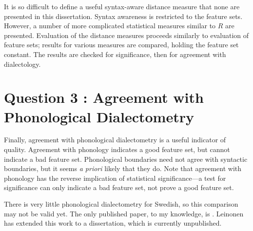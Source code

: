 It is so difficult to define a useful syntax-aware distance measure
that none are presented in this dissertation. Syntax awareness is
restricted to the feature sets. However, a number of more complicated
statistical measures similar to $R$ are presented. Evaluation of the
distance measures proceeds similarly to evaluation of feature sets;
results for various measures are compared, holding the feature set
constant. The results are checked for significance, then for agreement
with dialectology.


\section{Question 3 : Agreement with Phonological Dialectometry}

Finally, agreement with phonological dialectometry is a useful
indicator of quality. Agreement with phonology indicates a good
feature set, but cannot indicate a bad feature set. Phonological
boundaries need not agree with syntactic boundaries, but it seems {\it
  a priori} likely that they do. Note that agreement with phonology
has the reverse implication of statistical
significance---a test for significance can only indicate a bad
feature set, not prove a good feature set.

There is very little phonological dialectometry for Swedish, so this
comparison may not be valid yet. The only published paper, to my
knowledge, is . Leinonen has extended this work
to a dissertation, which is currently unpublished.

